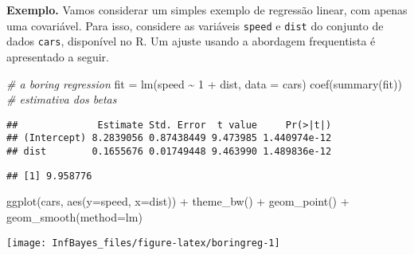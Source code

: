\documentclass[
]{book}
\newenvironment{Shaded}{\begin{snugshade}}{\end{snugshade}}
\newcommand{\AttributeTok}[1]{\textcolor[rgb]{0.77,0.63,0.00}{#1}}
\newcommand{\CommentTok}[1]{\textcolor[rgb]{0.56,0.35,0.01}{\textit{#1}}}
\newcommand{\DecValTok}[1]{\textcolor[rgb]{0.00,0.00,0.81}{#1}}
\newcommand{\FunctionTok}[1]{\textcolor[rgb]{0.00,0.00,0.00}{#1}}
\newcommand{\NormalTok}[1]{#1}
\newcommand{\OtherTok}[1]{\textcolor[rgb]{0.56,0.35,0.01}{#1}}
\newcommand{\SpecialCharTok}[1]{\textcolor[rgb]{0.00,0.00,0.00}{#1}}
\begin{document}
\(~\)

\textbf{Exemplo.} Vamos considerar um simples exemplo de regressão linear, com apenas uma covariável. Para isso, considere as variáveis \texttt{speed} e \texttt{dist} do conjunto de dados \texttt{cars}, disponível no R. Um ajuste usando a abordagem frequentista é apresentado a seguir.

\begin{Shaded}
\begin{Highlighting}[]
\CommentTok{\# a boring regression}
\NormalTok{fit }\OtherTok{=} \FunctionTok{lm}\NormalTok{(speed }\SpecialCharTok{\textasciitilde{}} \DecValTok{1} \SpecialCharTok{+}\NormalTok{ dist, }\AttributeTok{data =}\NormalTok{ cars)}
\FunctionTok{coef}\NormalTok{(}\FunctionTok{summary}\NormalTok{(fit)) }\CommentTok{\# estimativa dos betas}
\end{Highlighting}
\end{Shaded}

\begin{verbatim}
##              Estimate Std. Error  t value     Pr(>|t|)
## (Intercept) 8.2839056 0.87438449 9.473985 1.440974e-12
## dist        0.1655676 0.01749448 9.463990 1.489836e-12
\end{verbatim}

\begin{Shaded}
\end{Shaded}

\begin{verbatim}
## [1] 9.958776
\end{verbatim}

\begin{Shaded}
\begin{Highlighting}[]
\FunctionTok{ggplot}\NormalTok{(cars, }\FunctionTok{aes}\NormalTok{(}\AttributeTok{y=}\NormalTok{speed, }\AttributeTok{x=}\NormalTok{dist)) }\SpecialCharTok{+} \FunctionTok{theme\_bw}\NormalTok{() }\SpecialCharTok{+}
  \FunctionTok{geom\_point}\NormalTok{() }\SpecialCharTok{+} \FunctionTok{geom\_smooth}\NormalTok{(}\AttributeTok{method=}\NormalTok{lm)}
\end{Highlighting}
\end{Shaded}

\begin{center}\texttt{[image: InfBayes\_files/figure-latex/boringreg-1]} \end{center}
\end{document}
